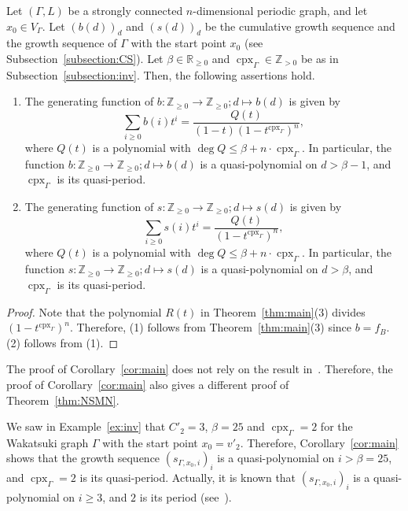\documentclass[11pt]{article}
\theoremstyle{definition}
\numberwithin{equation}{section}
\begin{document}
\begin{cor}\label{cor:main}
Let $(\Gamma , L)$ be a strongly connected $n$-dimensional periodic graph, and let $x_0 \in V_{\Gamma}$. 
Let $(b(d))_d$ and $(s(d))_d$ be the cumulative growth sequence and the growth sequence of $\Gamma$ with the start point $x_0$ 
(see Subsection~\ref{subsection:CS}). 
Let $\beta \in \mathbb{R}_{\ge 0}$ and $\operatorname{cpx}_{\Gamma} \in \mathbb{Z}_{>0}$ be as in Subsection~\ref{subsection:inv}. 
Then, the following assertions hold. 
\begin{enumerate}
\item 
The generating function of $b: \mathbb{Z}_{\ge 0} \to \mathbb{Z}_{\ge 0}; d \mapsto b(d)$ is given by 
\[
\sum _{i \ge 0} b(i) t^i = 
\frac{Q(t)}{(1-t) ( 1 - t^{\operatorname{cpx}_{\Gamma}} )^{n}}, 
\]
where $Q(t)$ is a polynomial with $\deg Q \le \beta + n \cdot \operatorname{cpx}_{\Gamma}$. 
In particular, the function $b: \mathbb{Z}_{\ge 0} \to \mathbb{Z}_{\ge 0}; d \mapsto b(d)$ is a quasi-polynomial on $d > \beta -1$, and 
$\operatorname{cpx}_{\Gamma}$ is its quasi-period. 

\item 
The generating function of $s: \mathbb{Z}_{\ge 0} \to \mathbb{Z}_{\ge 0}; d \mapsto s(d)$ is given by 
\[
\sum _{i \ge 0} s(i) t^i = 
\frac{Q(t)}{(1 - t^{\operatorname{cpx}_{\Gamma}} )^{n}}, 
\]
where $Q(t)$ is a polynomial with $\deg Q \le \beta + n \cdot \operatorname{cpx}_{\Gamma}$. 
In particular, 
the function $s: \mathbb{Z}_{\ge 0} \to \mathbb{Z}_{\ge 0}; d \mapsto s(d)$ is a quasi-polynomial on $d > \beta$, and 
$\operatorname{cpx}_{\Gamma}$ is its quasi-period. 
\end{enumerate}
\end{cor}
\begin{proof}
Note that the polynomial $R(t)$ in Theorem~\ref{thm:main}(3) divides $( 1 - t^{\operatorname{cpx}_{\Gamma}} )^{n}$. 
Therefore, 
(1) follows from Theorem~\ref{thm:main}(3) since $b = f_B$. 
(2) follows from (1). 
\end{proof}


\begin{rmk}\label{rmk:NSMN}
The proof of Corollary~\ref{cor:main} does not rely on the result in~\cite{NSMN21}. 
Therefore, the proof of Corollary~\ref{cor:main} also gives a different proof of Theorem~\ref{thm:NSMN}. 
\end{rmk}

\begin{ex}
We saw in Example~\ref{ex:inv} that $C'_2 = 3$, $\beta = 25$ and $\operatorname{cpx}_{\Gamma} = 2$ 
for the Wakatsuki graph $\Gamma$ with the start point $x_0 = v'_2$. 
Therefore, Corollary~\ref{cor:main} shows that the growth sequence $(s_{\Gamma, x_0, i})_i$  is 
a quasi-polynomial on $i > \beta = 25$, and 
$\operatorname{cpx}_{\Gamma} = 2$ is its quasi-period. 
Actually, it is known that $(s_{\Gamma, x_0, i})_i$ is a quasi-polynomial on $i \ge 3$, and $2$ is its period (see~\cite[Example 2.18]{IN}). 
\end{ex}
\end{document}
